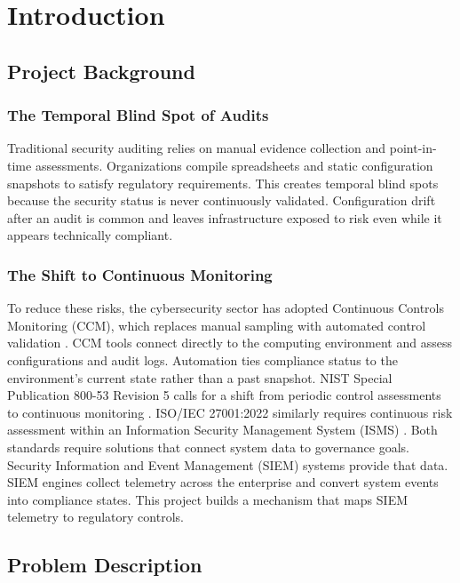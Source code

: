 \chapter{Introduction}

\section{Project Background}

\subsection{The Temporal Blind Spot of Audits}
Traditional security auditing relies on manual evidence collection and point-in-time assessments. Organizations compile spreadsheets and static configuration snapshots to satisfy regulatory requirements. This creates temporal blind spots because the security status is never continuously validated. Configuration drift after an audit is common and leaves infrastructure exposed to risk even while it appears technically compliant.

\subsection{The Shift to Continuous Monitoring}
To reduce these risks, the cybersecurity sector has adopted Continuous Controls Monitoring (CCM), which replaces manual sampling with automated control validation \cite{bukhari2021automated}. CCM tools connect directly to the computing environment and assess configurations and audit logs. Automation ties compliance status to the environment's current state rather than a past snapshot. NIST Special Publication 800-53 Revision 5 calls for a shift from periodic control assessments to continuous monitoring \cite{nist80053r5}. ISO/IEC 27001:2022 similarly requires continuous risk assessment within an Information Security Management System (ISMS) \cite{quispe2026enhancing}. Both standards require solutions that connect system data to governance goals. Security Information and Event Management (SIEM) systems provide that data. SIEM engines collect telemetry across the enterprise and convert system events into compliance states. This project builds a mechanism that maps SIEM telemetry to regulatory controls.

\section{Problem Description}

